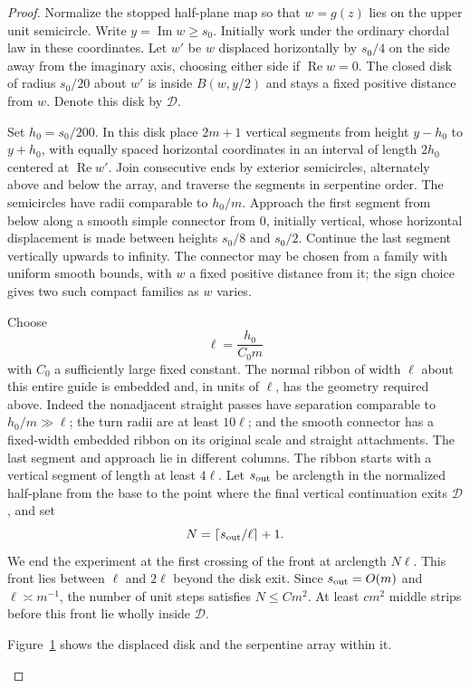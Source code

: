 \begin{proof}
Normalize the stopped half-plane map so that $w=g(z)$ lies on the upper
unit semicircle.  Write $y=\operatorname{Im}w\ge s_0$.  Initially work
under the ordinary chordal law in these coordinates.  Let $w'$ be
$w$ displaced horizontally by $s_0/4$ on the side away from the imaginary
axis, choosing either side if $\operatorname{Re}w=0$.  The closed disk
of radius $s_0/20$ about $w'$ is inside $B(w,y/2)$ and stays a fixed
positive distance from $w$. Denote this disk by $\mathcal D$.

Set $h_0=s_0/200$.  In this disk place $2m+1$ vertical segments from
height $y-h_0$ to $y+h_0$, with equally spaced horizontal coordinates
in an interval of length $2h_0$ centered at $\operatorname{Re}w'$.
Join consecutive ends by exterior semicircles, alternately above and
below the array, and traverse the segments in serpentine order.  The
semicircles have radii comparable to $h_0/m$.  Approach the first segment
from below along a smooth simple connector from $0$, initially vertical,
whose horizontal displacement is made between heights $s_0/8$ and
$s_0/2$.  Continue the last segment vertically upwards to infinity.
The connector may be chosen from a family with uniform smooth bounds,
with $w$ a fixed positive distance from it; the sign choice gives two
such compact families as $w$ varies.

Choose
\[
 \ell=\frac{h_0}{C_0m}
\]
with $C_0$ a sufficiently large fixed constant.  The normal ribbon of
width $\ell$ about this entire guide is embedded and, in units of
$\ell$, has the geometry required above.  Indeed the nonadjacent
straight passes have separation comparable to $h_0/m\gg\ell$;
the turn radii are at least $10\ell$; and the smooth connector has a
fixed-width embedded ribbon on its original scale and straight
attachments.  The last segment and approach lie in different columns.
The ribbon starts with a vertical segment of length at least $4\ell$.
Let $s_{\rm out}$ be arclength in the normalized half-plane from the
base to the point where the final vertical continuation exits $\mathcal D$,
and set
\[
 N=\left\lceil s_{\rm out}/\ell\right\rceil+1.
\]
We end the experiment at the first crossing of the front at arclength
$N\ell$. This front lies between $\ell$ and $2\ell$ beyond the disk
exit. Since $s_{\rm out}=O(m)$ and $\ell\asymp m^{-1}$, the number of
unit steps satisfies $N\le Cm^2$. At least $cm^2$ middle strips before
this front lie wholly inside $\mathcal D$.

Figure~\ref{fig:serpentine-ribbon} shows the displaced disk and the
serpentine array within it.
\begin{figure}[!htbp]
\centering

\caption{\SerpentineRibbonCaption}
\label{fig:serpentine-ribbon}
\end{figure}


\end{proof}
